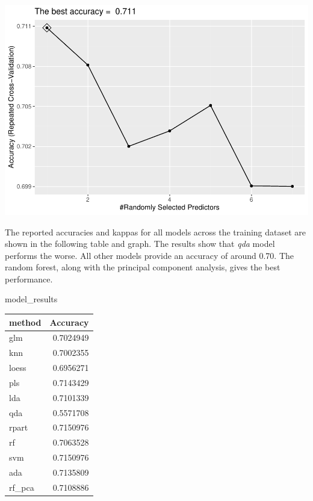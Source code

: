 \documentclass[]{article}
\newenvironment{Shaded}{\begin{snugshade}}{\end{snugshade}}
\newcommand{\CommentTok}[1]{\textcolor[rgb]{0.56,0.35,0.01}{\textit{#1}}}
\newcommand{\DataTypeTok}[1]{\textcolor[rgb]{0.13,0.29,0.53}{#1}}
\newcommand{\KeywordTok}[1]{\textcolor[rgb]{0.13,0.29,0.53}{\textbf{#1}}}
\newcommand{\NormalTok}[1]{#1}
\newcommand{\OperatorTok}[1]{\textcolor[rgb]{0.81,0.36,0.00}{\textbf{#1}}}
\newcommand{\StringTok}[1]{\textcolor[rgb]{0.31,0.60,0.02}{#1}}
\begin{document}
\includegraphics{LiverDisease_files/figure-latex/unnamed-chunk-35-1.pdf}

\begin{Shaded}
\end{Shaded}

The reported accuracies and kappas for all models across the training
dataset are shown in the following table and graph. The results show
that \emph{qda} model performs the worse. All other models provide an
accuracy of around 0.70. The random forest, along with the principal
component analysis, gives the best performance.

\begin{Shaded}
\begin{Highlighting}[]
\NormalTok{model_results}
\end{Highlighting}
\end{Shaded}

\begin{longtable}[]{@{}lr@{}}
\toprule
method & Accuracy\tabularnewline
\midrule
\endhead
glm & 0.7024949\tabularnewline
knn & 0.7002355\tabularnewline
loess & 0.6956271\tabularnewline
pls & 0.7143429\tabularnewline
lda & 0.7101339\tabularnewline
qda & 0.5571708\tabularnewline
rpart & 0.7150976\tabularnewline
rf & 0.7063528\tabularnewline
svm & 0.7150976\tabularnewline
ada & 0.7135809\tabularnewline
rf\_pca & 0.7108886\tabularnewline
\bottomrule
\end{longtable}
\end{document}
